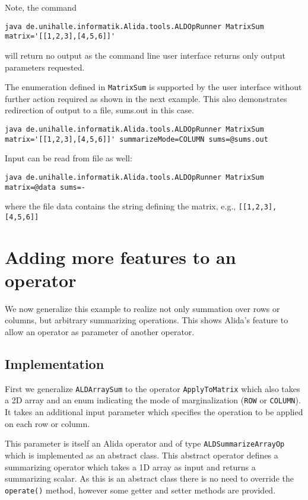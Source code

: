 Note, the command

\lstinline+java de.unihalle.informatik.Alida.tools.ALDOpRunner MatrixSum matrix='[[1,2,3],[4,5,6]]' +

will return no output as the command line user interface returns only output parameters requested.

The enumeration defined in \lstinline+MatrixSum+ is supported by the
user interface without further action required as shown in the next example.
This also demonstrates redirection of output
to a file, sums.out in this case.

\lstinline+java de.unihalle.informatik.Alida.tools.ALDOpRunner MatrixSum matrix='[[1,2,3],[4,5,6]]' summarizeMode=COLUMN sums=@sums.out+

Input can be read from file as well:

\lstinline+java de.unihalle.informatik.Alida.tools.ALDOpRunner MatrixSum matrix=@data sums=-+

where the file data contains the string defining the matrix, e.g., \lstinline+[[1,2,3],[4,5,6]]+

\section{Adding more features to an operator}

We now generalize this example to realize not only summation over rows or
columns, but arbitrary summarizing operations.
This shows Alida's feature to allow an operator as parameter of another operator.

\subsection{Implementation}

First we generalize \lstinline+ALDArraySum+ to the operator \lstinline+ApplyToMatrix+
which also takes a 2D array and an enum indicating the mode of marginalization (\lstinline+ROW+ or \lstinline+COLUMN+).
It takes an additional input parameter which specifies the operation to be applied on each
row or column.

This parameter is itself an Alida operator and of type \lstinline+ALDSummarizeArrayOp+
which is implemented as an abstract class.
This abstract operator defines a summarizing operator
which takes a 1D array as input and returns a summarizing scalar.
As this is an abstract class there is no need to override the \lstinline+operate()+
method, however some getter and setter methods are provided.

